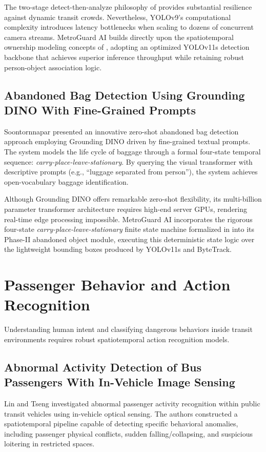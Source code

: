\documentclass[12pt,a4paper]{report}
\begin{document}
The two-stage detect-then-analyze philosophy of \cite{p6} provides substantial resilience against dynamic transit crowds. Nevertheless, YOLOv9's computational complexity introduces latency bottlenecks when scaling to dozens of concurrent camera streams. MetroGuard AI builds directly upon the spatiotemporal ownership modeling concepts of \cite{p6}, adopting an optimized YOLOv11s detection backbone that achieves superior inference throughput while retaining robust person-object association logic.

\subsection{Abandoned Bag Detection Using Grounding DINO With Fine-Grained Prompts}
Soontornnapar \cite{p21} presented an innovative zero-shot abandoned bag detection approach employing Grounding DINO driven by fine-grained textual prompts. The system models the life cycle of baggage through a formal four-state temporal sequence: \emph{carry-place-leave-stationary}. By querying the visual transformer with descriptive prompts (e.g., ``luggage separated from person''), the system achieves open-vocabulary baggage identification.

Although Grounding DINO offers remarkable zero-shot flexibility, its multi-billion parameter transformer architecture requires high-end server GPUs, rendering real-time edge processing impossible. MetroGuard AI incorporates the rigorous four-state \emph{carry-place-leave-stationary} finite state machine formalized in \cite{p21} into its Phase-II abandoned object module, executing this deterministic state logic over the lightweight bounding boxes produced by YOLOv11s and ByteTrack.

\section{Passenger Behavior and Action Recognition}
Understanding human intent and classifying dangerous behaviors inside transit environments requires robust spatiotemporal action recognition models.

\subsection{Abnormal Activity Detection of Bus Passengers With In-Vehicle Image Sensing}
Lin and Tseng \cite{p4} investigated abnormal passenger activity recognition within public transit vehicles using in-vehicle optical sensing. The authors constructed a spatiotemporal pipeline capable of detecting specific behavioral anomalies, including passenger physical conflicts, sudden falling/collapsing, and suspicious loitering in restricted spaces.
\end{document}
